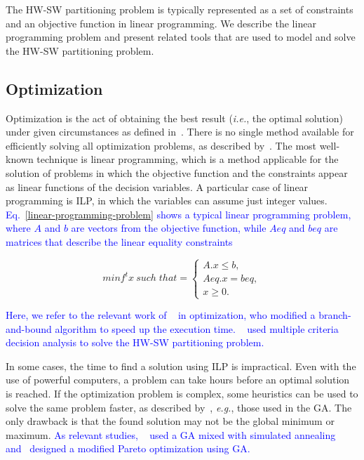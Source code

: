 \documentclass{doublecol-new}
\theoremstyle{TH}{
\newtheorem{lemma}{Lemma}
\newtheorem{theorem}[lemma]{Theorem}
\newtheorem{corrolary}[lemma]{Corrolary}
\newtheorem{conjecture}[lemma]{Conjecture}
\newtheorem{proposition}[lemma]{Proposition}
\newtheorem{claim}[lemma]{Claim}
\newtheorem{stheorem}[lemma]{Wrong Theorem}
\newtheorem{algorithm}{Algorithm}
}
\theoremstyle{THrm}{
\newtheorem{definition}{Definition}[section]
\newtheorem{question}{Question}[section]
\newtheorem{remark}{Remark}
\newtheorem{scheme}{Scheme}
}
\theoremstyle{THhit}{
\newtheorem{case}{Case}[section]
}
\begin{document}
The HW-SW partitioning problem is typically represented as a set of constraints and an objective function in linear programming. We describe the linear programming problem and present related tools that are used to model and solve the HW-SW partitioning problem.

\subsection{Optimization}
\label{Optimization}

Optimization is the act of obtaining the best result ({\it i.e.}, the optimal solution) under given circumstances as defined in~\cite{Rao2009}. There is no single method available for efficiently solving all optimization problems, as described by~\cite{Rao2009}. The most well-known technique is linear programming, which is a method applicable for the solution of problems in which the objective function and the constraints appear as linear functions of the decision variables. A particular case of linear programming is ILP, in which the variables can assume just integer values. \textcolor{blue}{Eq.~\eqref{linear-programming-problem} shows a typical linear programming problem, where $A$ and $b$ are vectors from the objective function, while $Aeq$ and $beq$ are matrices that describe the linear equality constraints}

\vspace{2 mm}
\begin{equation}
\label{linear-programming-problem}
  minf^t x \: such \; that  = 
  \begin{cases}
    A.x \leq b, \\ 
    Aeq.x = beq, \\ 
    x \geq 0.
  \end{cases}
\end{equation}

\vspace{2 mm}
\textcolor{blue}{Here, we refer to the relevant work of ~\cite{Mann2007} in optimization, who modified a branch-and-bound algorithm to speed up the execution time. ~\cite{Sapienza2013} used multiple criteria decision analysis to solve the HW-SW partitioning problem.}

In some cases, the time to find a solution using ILP is impractical. Even with the use of powerful computers, a problem can take hours before an optimal solution is reached. If the optimization problem is complex, some heuristics can be used to solve the same problem faster, as described by~\cite{Rao2009}, {\it e.g.}, those used in the GA. The only drawback is that the found solution may not be the global minimum or maximum. \textcolor{blue}{As relevant studies, ~\cite{Jiang2012} used a GA mixed with simulated annealing and~\cite{Huong2012} designed a modified Pareto optimization using GA.}
\end{document}
